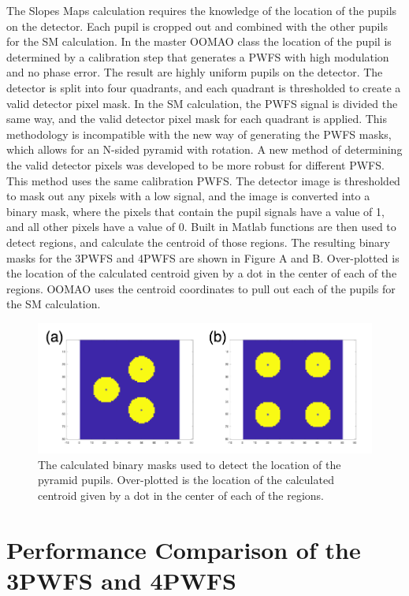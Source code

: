 The Slopes Maps calculation requires the knowledge of the location of the pupils on the detector. Each pupil is cropped out and combined with the other pupils for the SM calculation. In the master OOMAO class the location of the pupil is determined by a calibration step that generates a PWFS with high modulation and no phase error. The result are highly uniform pupils on the detector. The detector is split into four quadrants, and each quadrant is thresholded to create a valid detector pixel mask. In the SM calculation, the PWFS signal is divided the same way, and the valid detector pixel mask for each quadrant is applied. This methodology is incompatible with the new way of generating the PWFS masks, which allows for an N-sided pyramid with rotation. A new method of determining the valid detector pixels was developed to be more robust for different PWFS. This method uses the same calibration PWFS. The detector image is thresholded to mask out any pixels with a low signal, and the image is converted into a binary mask, where the pixels that contain the pupil signals have a value of 1, and all other pixels have a value of 0. Built in Matlab functions are then used to detect regions, and calculate the centroid of those regions. The resulting binary masks for the 3PWFS and 4PWFS are shown in Figure \pyrcen A and B. Over-plotted is the location of the calculated centroid given by a dot in the center of each of the regions. OOMAO uses the centroid coordinates to pull out each of the pupils for the SM calculation.

\begin{figure}
    \centering
    \includegraphics[width=.8\textwidth]{Chapter Materials/Chapter Four Materials/pyramidCenters.png}
    \caption{The calculated binary masks used to detect the location of the pyramid pupils. Over-plotted is the location of the calculated centroid given by a dot in the center of each of the regions.}
    \label{fig:pyrcen}
\end{figure}


\section{Performance Comparison of the 3PWFS and 4PWFS}
